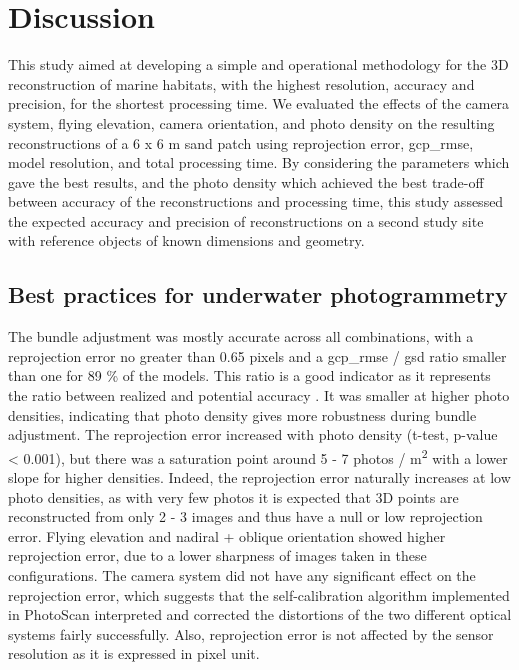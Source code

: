 \section[Discussion]{Discussion}\label{chapitre1_4}
This study aimed at developing a simple and operational methodology for the 3D reconstruction of marine habitats, with the highest resolution, accuracy and precision, for the shortest processing time. We evaluated the effects of the camera system, flying elevation, camera orientation, and photo density on the resulting reconstructions of a 6 x 6 m sand patch using reprojection error, \acrshort{gcp_rmse}, model resolution, and total processing time. By considering the parameters which gave the best results, and the photo density which achieved the best trade-off between accuracy of the reconstructions and processing time, this study assessed the expected accuracy and precision of reconstructions on a second study site with reference objects of known dimensions and geometry.

\subsection{Best practices for underwater photogrammetry}\label{chapitre1_4.1}
The bundle adjustment was mostly accurate across all combinations, with a reprojection error no greater than 0.65 pixels and a \acrshort{gcp_rmse} / \acrshort{gsd} ratio smaller than one for 89 \% of the models. This ratio is a good indicator as it represents the ratio between realized and potential accuracy \citep{forstner_photogrammetric_2016}. It was smaller at higher photo densities, indicating that photo density gives more robustness during bundle adjustment. The reprojection error increased with photo density (t-test, p-value < 0.001), but there was a saturation point around 5 - 7 photos / m\textsuperscript{2} with a lower slope for higher densities. Indeed, the reprojection error naturally increases at low photo densities, as with very few photos it is expected that 3D points are reconstructed from only 2 - 3 images and thus have a null or low reprojection error. Flying elevation and nadiral + oblique orientation showed higher reprojection error, due to a lower sharpness of images taken in these configurations. The camera system did not have any significant effect on the reprojection error, which suggests that the self-calibration algorithm implemented in PhotoScan interpreted and corrected the distortions of the two different optical systems fairly successfully. Also, reprojection error is not affected by the sensor resolution as it is expressed in pixel unit.

